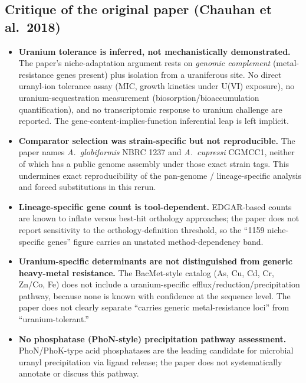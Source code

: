 \documentclass[11pt]{article}
\begin{document}
\subsection*{Critique of the original paper (Chauhan et al.\ 2018)}
\begin{itemize}
  \item \textbf{Uranium tolerance is inferred, not mechanistically demonstrated.} The paper's niche-adaptation argument rests on \emph{genomic complement} (metal-resistance genes present) plus isolation from a uraniferous site. No direct uranyl-ion tolerance assay (MIC, growth kinetics under U(VI) exposure), no uranium-sequestration measurement (biosorption/bioaccumulation quantification), and no transcriptomic response to uranium challenge are reported. The gene-content-implies-function inferential leap is left implicit.
  \item \textbf{Comparator selection was strain-specific but not reproducible.} The paper names \textit{A.\ globiformis} NBRC 1237 and \textit{A.\ cupressi} CGMCC1, neither of which has a public genome assembly under those exact strain tags. This undermines exact reproducibility of the pan-genome / lineage-specific analysis and forced substitutions in this rerun.
  \item \textbf{Lineage-specific gene count is tool-dependent.} EDGAR-based counts are known to inflate versus best-hit orthology approaches; the paper does not report sensitivity to the orthology-definition threshold, so the ``1159 niche-specific genes'' figure carries an unstated method-dependency band.
  \item \textbf{Uranium-specific determinants are not distinguished from generic heavy-metal resistance.} The BacMet-style catalog (As, Cu, Cd, Cr, Zn/Co, Fe) does not include a uranium-specific efflux/reduction/precipitation pathway, because none is known with confidence at the sequence level. The paper does not clearly separate ``carries generic metal-resistance loci'' from ``uranium-tolerant.''
  \item \textbf{No phosphatase (PhoN-style) precipitation pathway assessment.} PhoN/PhoK-type acid phosphatases are the leading candidate for microbial uranyl precipitation via ligand release; the paper does not systematically annotate or discuss this pathway.
\end{itemize}
\end{document}
